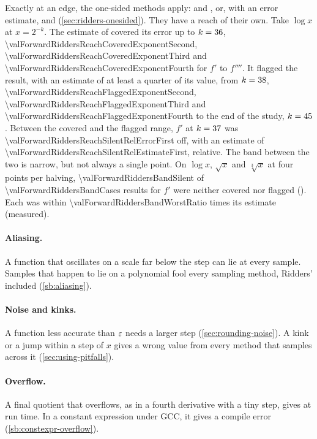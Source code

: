 Exactly at an edge, the one-sided methods apply:  and , or, with an error
estimate,  and  (\cref{sec:ridders-onesided}). They have a reach of their
own. Take $\log x$ at $x = 2^{-k}$. The estimate of  covered its error up to
$k = \num{36}$, \num{\valForwardRiddersReachCoveredExponentSecond},
\num{\valForwardRiddersReachCoveredExponentThird} and \num{\valForwardRiddersReachCoveredExponentFourth} for $f'$
to $f''''$. It flagged the result, with an estimate of at least a quarter of its value, from
$k = \num{38}$, \num{\valForwardRiddersReachFlaggedExponentSecond},
\num{\valForwardRiddersReachFlaggedExponentThird} and \num{\valForwardRiddersReachFlaggedExponentFourth} to the end
of the study, $k = \num{45}$. Between the covered and the flagged range, $f'$ at
$k = \num{37}$ was \num{\valForwardRiddersReachSilentRelErrorFirst} off, with
an estimate of \num{\valForwardRiddersReachSilentRelEstimateFirst}, relative. The band between the two is narrow, but
not always a single point. On $\log x$, $\sqrt{x}$ and $\sqrt[3]{x}$ at four points per halving,
\num{\valForwardRiddersBandSilent} of \num{\valForwardRiddersBandCases} results for $f'$ were neither covered nor
flagged (\valForwardRiddersBandFunctions). Each was within \num{\valForwardRiddersBandWorstRatio} times its estimate
(measured).

\paragraph{Aliasing.} A function that oscillates on a scale far below the step can lie at every sample. Samples that
happen to lie on a polynomial fool every sampling method, Ridders' included (\cref{sb:aliasing}).

\paragraph{Noise and kinks.} A function less accurate than $\varepsilon$ needs a larger step (\cref{sec:rounding-noise}).
A kink or a jump within a step of $x$ gives a wrong value from every method that samples across it
(\cref{sec:using-pitfalls}).

\paragraph{Overflow.} A final quotient that overflows, as in a fourth derivative with a tiny step, gives
 at run time. In a constant expression under GCC, it gives a compile error
(\cref{sb:constexpr-overflow}).

